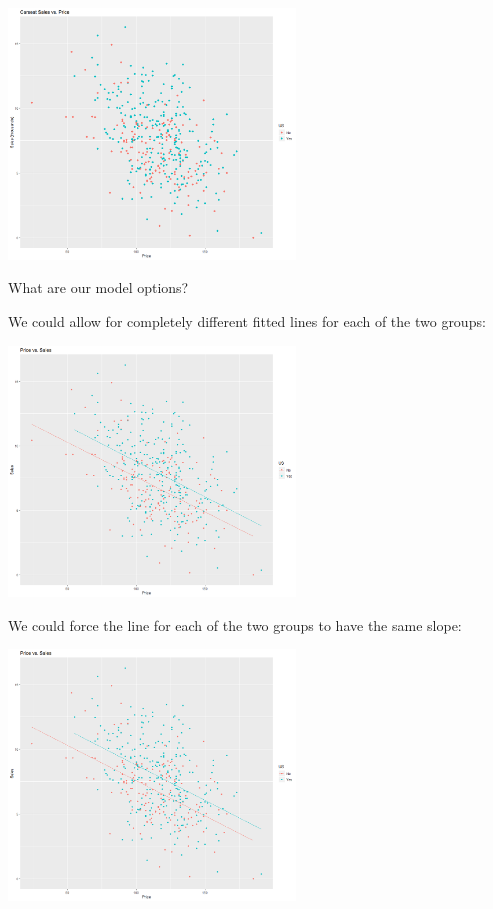 \begin{frame}
\begin{center}
	\includegraphics[width = 3in]{SalesPriceUSPoints.png}
\end{center}
\bi
	\item What are our model options?
\ei
\end{frame}

\begin{frame}
\bi
	\item We could allow for completely different fitted lines for each of the two groups:
\ei
\begin{center}
	\includegraphics[width = 3in]{SalesPriceUSfull.png}
\end{center}
\end{frame}

\begin{frame}
\bi
	\item We could force the line for each of the two groups to have the same slope:
\ei
\begin{center}
	\includegraphics[width = 3in]{SalesPriceUSsameslope.png}
\end{center}
\end{frame}

